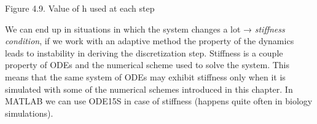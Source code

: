 Figure 4.9. Value of h used at each step

We can end up in situations in which the system changes a lot →
\emph{stiffness condition}, if we work with an adaptive method the
property of the dynamics leads to instability in deriving the
discretization step. Stiffness is a couple property of ODEs and the
numerical scheme used to solve the system. This means that the same
system of ODEs may exhibit stiffness only when it is simulated with some
of the numerical schemes introduced in this chapter. In MATLAB we can
use ODE15S in case of stiffness (happens quite often in biology
simulations).
